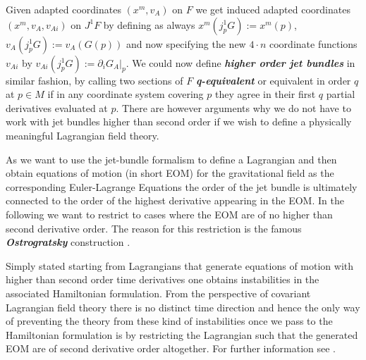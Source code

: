 \documentclass[a4paper,12pt, DIV=14, BCOR=5mm, twoside, headsepline]{scrbook}
\begin{document}
Given adapted coordinates $(x^m,v_A)$ on $F$ we get induced adapted coordinates $(x^m, v_A, v_{Ai})$ on $J^1F$ by defining as always $x^m(j^1_pG) := x^m(p)$, $v_A(j^1_pG) := v_A(G(p))$ and now specifying the new $4 \cdot n$ coordinate functions $v_{Ai}$ by $v_{Ai}(j^1_pG) := \partial_iG_A \vert_p$.
We could now define \textit{\textbf{higher order jet bundles}} in similar fashion, by calling two sections of $F$ \textit{\textbf{q-equivalent}} or equivalent in order $q$ at $p \in M$ if in any coordinate system covering $p$ they agree in their first $q$ partial derivatives evaluated at $p$. There are however arguments why we do not have to work with jet bundles higher than second order if we wish to define a physically meaningful Lagrangian field theory.

As we want to use the jet-bundle formalism to define a Lagrangian and then obtain equations of motion (in short EOM) for the gravitational field as the corresponding Euler-Lagrange Equations the order of the jet bundle is ultimately connected to the order of the highest derivative appearing in the EOM. In the following we want to restrict to cases where the EOM are of no higher than second derivative order. The reason for this restriction is the famous \textbf{\textit{Ostrogratsky}} construction \cite{Ostrogradsky:1850fid}. 

Simply stated starting from Lagrangians that generate equations of motion with higher than second order time derivatives one obtains instabilities in the associated Hamiltonian formulation. From the perspective of covariant Lagrangian field theory there is no distinct time direction and hence the only way of preventing the theory from these kind of instabilities once we pass to the Hamiltonian formulation is by restricting the Lagrangian such that the generated EOM are of second derivative order altogether. For further information see \cite{2015arXiv150602210W}. 
\end{document}

